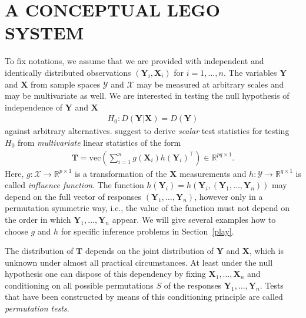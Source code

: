 \documentclass{article}
\newcommand{\R}{\mathbb{R} }
\newcommand{\X}{\mathbf{X}}
\newcommand{\Y}{\mathbf{Y}}
\newcommand{\T}{\mathbf{T}}
\renewcommand{\vec}{\text{vec}}
\begin{document}
\section{A CONCEPTUAL LEGO SYSTEM \label{CI}}

To fix notations,
we assume that we are provided with independent and identically distributed 
observations
$(\Y_i, \X_i)$ for $i = 1, \dots, n$.
The variables $\Y$ and $\X$ from sample spaces $\mathcal{Y}$ and
$\mathcal{X}$ may
be measured at arbitrary scales and may be multivariate as well. 
We are interested in testing the null hypothesis of independence of $\Y$ and $\X$
\begin{eqnarray*}
H_0: D(\Y | \X) = D(\Y)
\end{eqnarray*}
against arbitrary alternatives. \cite{StrasserWeber1999} suggest to derive
\textit{scalar} test statistics for testing $H_0$ from \textit{multivariate}
linear statistics of the form 
\begin{eqnarray*}
\T = \vec\left(\sum_{i = 1}^n g(\X_i) h(\Y_i)^\top\right)
\in \R^{pq \times 1}.
\end{eqnarray*}
Here, $g: \mathcal{X} \rightarrow \R^{p \times 1}$ is a transformation of
the $\X$ measurements and $h: \mathcal{Y} \rightarrow
\R^{q \times 1}$ is called \emph{influence function}. The function $h(\Y_i)
= h(\Y_i, (\Y_1, \dots, \Y_n))$ may depend on the full vector of responses 
$(\Y_1, \dots, \Y_n)$, however only 
in a permutation symmetric way, i.e., the value of the
function must not depend on the order in which $\Y_1, \dots, \Y_n$ appear.
We will give several examples how to choose $g$ and $h$
for specific inference problems in Section~\ref{play}.

The distribution of $\T$  depends on the joint distribution of $\Y$ and $\X$, 
which is unknown under almost all practical circumstances. 
At least under the null hypothesis one can dispose of this 
dependency by fixing $\X_1, \dots, \X_n$ and conditioning on all possible 
permutations $S$ of the responses $\Y_1, \dots, \Y_n$. Tests that have been 
constructed by means of this conditioning principle are called 
\emph{permutation tests}.
\end{document}
